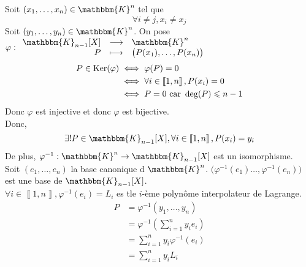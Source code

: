 \begin{exm}
	Soit $(x_1, \ldots, x_n) \in \mathbbm{K}^n$ tel que \[
		\forall i \neq j, x_i \neq x_j
	\] Soit $(y_1, \ldots, y_n) \in \mathbbm{K}^n$.
	On pose $\varphi : \begin{array}{rcl}
		\mathbbm{K}_{n-1}[X] &\longrightarrow& \mathbbm{K}^n \\
		P &\longmapsto& \big(P(x_1), \ldots, P(x_n)\big)
	\end{array}$\\
	\begin{align*}
		P \in \operatorname{Ker}(\varphi) &\iff \varphi(P) = 0\\
		&\iff \forall i \in \left\llbracket 1, n \right\rrbracket, P(x_i) = 0\\
		&\iff P = 0 \text{ car } \deg(P) \leqslant n-1
	\end{align*}
	Donc $\varphi$ est injective et donc $\varphi$ est bijective.\\
	Donc, \[
		\exists! P \in \mathbbm{K}_{n-1}[X], \forall i \in \left\llbracket 1,n \right\rrbracket, P(x_i) = y_i
	\] De plus, $\varphi^{-1}: \mathbbm{K}^n \to \mathbbm{K}_{n-1}[X]$ est un isomorphisme.\\
	Soit $(e_1, \ldots, e_n)$ la base canonique d $\mathbbm{K}^n$. $\big(\varphi^{-1}(e_1) \ldots, \varphi^{-1}(e_n)\big)$ est une base de $\mathbbm{K}_{n-1}[X]$.\\
	$\forall i \in \left\llbracket 1,n \right\rrbracket, \varphi^{-1}(e_i) = L_i$ es tle $i$-ème polynôme interpolateur de Lagrange.\\
	\begin{align*}
		P &= \varphi^{-1}(y_1, \ldots, y_n)\\
		&= \varphi^{-1}\left( \sum_{i=1}^n y_i e_i \right) \\
		&= \sum_{i=1}^n y_i \varphi^{-1}(e_i) \\
		&= \sum_{i=1}^n y_i L_i \\
	\end{align*}
\end{exm}

